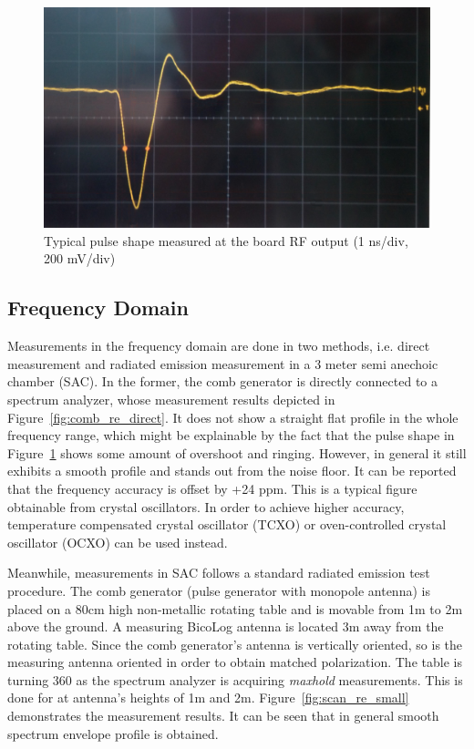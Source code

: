 \documentclass{pj}
\begin{document}
\begin{figure}[h]
	\centerline{\includegraphics[width=0.6\columnwidth,draft=false]{comb_re_osc_out_2.pdf}}
	\caption{Typical pulse shape measured at the board RF output (1 ns/div, 200 mV/div)}
	\label{fig:comb_re_pulse_out}
\end{figure}

\subsection{Frequency Domain}

Measurements in the frequency domain are done in two methods, i.e. direct measurement and radiated emission measurement in a 3 meter semi anechoic chamber (SAC). In the former, the comb generator is directly connected to a spectrum analyzer, whose measurement results depicted in Figure~\ref{fig:comb_re_direct}. It does not show a straight flat profile in the whole frequency range, which might be explainable by the fact that the pulse shape in Figure~\ref{fig:comb_re_pulse_out} shows some amount of overshoot and ringing.  However, in general it still exhibits a smooth profile and stands out from the noise floor. It can be reported that the frequency accuracy is offset by +24 ppm. This is a typical figure obtainable from crystal oscillators. In order to achieve higher accuracy, temperature compensated crystal oscillator (TCXO) or oven-controlled crystal oscillator (OCXO) can be used instead.

Meanwhile, measurements in SAC follows a standard radiated emission test procedure. The comb generator (pulse generator with monopole antenna) is placed on a 80cm high non-metallic rotating table and is movable from 1m to 2m above the ground. A measuring BicoLog antenna is located 3m away from the rotating table. Since the comb generator's antenna is vertically oriented, so is the measuring antenna oriented in order to obtain matched polarization. The table is turning 360\textdegree{} as the spectrum analyzer is acquiring  \textit{maxhold} measurements. This is done for at antenna's heights of 1m and 2m. Figure~\ref{fig:scan_re_small} demonstrates the measurement results. It can be seen that in general smooth spectrum envelope profile is obtained.  
\end{document}
